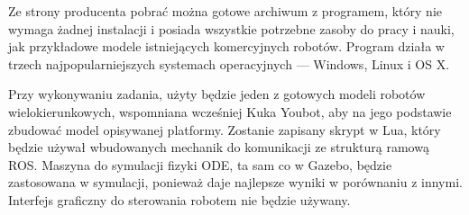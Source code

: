 	Ze strony producenta pobrać można gotowe archiwum z programem, który nie wymaga żadnej instalacji i posiada wszystkie potrzebne zasoby do pracy i nauki, 
	jak przykładowe modele istniejących komercyjnych robotów.
	Program działa w trzech najpopularniejszych systemach operacyjnych --- Windows, Linux i OS X.
	
	Przy wykonywaniu zadania, użyty będzie jeden z gotowych modeli robotów wielokierunkowych, wspomniana wcześniej Kuka Youbot, aby na jego podstawie zbudować model opisywanej platformy. Zostanie zapisany skrypt w Lua, który będzie używał wbudowanych mechanik do komunikacji ze strukturą ramową ROS. 
	Maszyna do symulacji fizyki ODE, ta sam co w Gazebo, będzie zastosowana w symulacji, ponieważ daje najlepsze wyniki w porównaniu z innymi. 
	Interfejs graficzny do sterowania robotem nie będzie używany.

